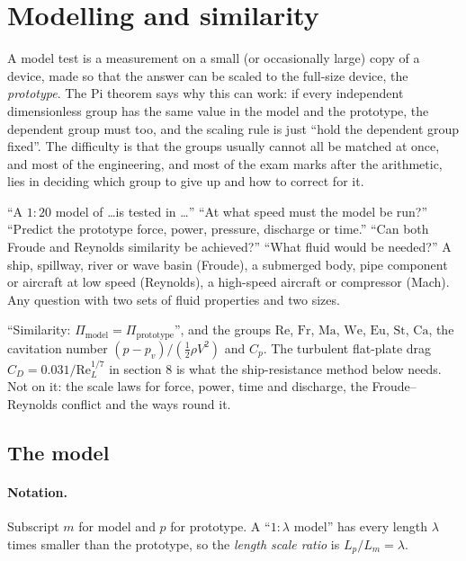 \section{Modelling and similarity}
\label{sec:similarity}

A model test is a measurement on a small (or occasionally large) copy of a device, made so that the answer can be scaled to the full-size device, the \emph{prototype}. The Pi theorem says why this can work: if every independent dimensionless group has the same value in the model and the prototype, the dependent group must too, and the scaling rule is just ``hold the dependent group fixed''. The difficulty is that the groups usually cannot all be matched at once, and most of the engineering, and most of the exam marks after the arithmetic, lies in deciding which group to give up and how to correct for it.

\begin{recognise}
``A $1{:}20$ model of \dots is tested in \dots'' ``At what speed must the model be run?'' ``Predict the prototype force, power, pressure, discharge or time.'' ``Can both Froude and Reynolds similarity be achieved?'' ``What fluid would be needed?'' A ship, spillway, river or wave basin (Froude), a submerged body, pipe component or aircraft at low speed (Reynolds), a high-speed aircraft or compressor (Mach). Any question with two sets of fluid properties and two sizes.
\end{recognise}

\begin{onsheet}
``Similarity: $\Pi_{\text{model}} = \Pi_{\text{prototype}}$'', and the groups $\mathrm{Re}$, $\mathrm{Fr}$, $\mathrm{Ma}$, $\mathrm{We}$, $\mathrm{Eu}$, $\mathrm{St}$, $\mathrm{Ca}$, the cavitation number $(p - p_v)/(\tfrac12\rho V^2)$ and $C_p$. The turbulent flat-plate drag $C_D = 0.031/\mathrm{Re}_L^{1/7}$ in section 8 is what the ship-resistance method below needs. Not on it: the scale laws for force, power, time and discharge, the Froude--Reynolds conflict and the ways round it.
\end{onsheet}

\subsection*{The model}

\paragraph{Notation.} Subscript $m$ for model and $p$ for prototype. A ``$1{:}\lambda$ model'' has every length $\lambda$ times smaller than the prototype, so the \emph{length scale ratio} is $L_p/L_m = \lambda$.

